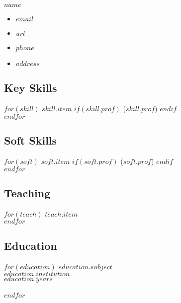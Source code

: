 \documentclass[$fontsize$, letter]{article}
\newcommand{\heading}[1]{
    \hrulefill \vspace{-0.5cm} \subsection*{{\color{gray} #1}}
}
\begin{document}
\begin{minipage}[t]{0.4\textwidth}
    {\Huge $name$}\\[.2cm]
\end{minipage}
\hfill
\begin{minipage}[b][2cm][b]{0.4\textwidth}
    \begin{itemize}[label={}, align=right]
        \item \hfill $email$
        \item \hfill \href{https://www.$url$}{$url$}
        \item \hfill $phone$
        \item \hfill $address$
    \end{itemize}
\end{minipage}


\begin{minipage}[t]{0.3\textwidth} %

\heading{Key Skills}
$for(skill)$
$skill.item$ $if(skill.prof)$ {\color{gray}($skill.prof$)} $endif$\\
$endfor$

\heading{Soft Skills}
$for(soft)$
$soft.item$ $if(soft.prof)$ {\color{gray}($soft.prof$)} $endif$\\
$endfor$

\heading{Teaching}
$for(teach)$
$teach.item$\\
$endfor$

\heading{Education}
$for(education)$
    $education.subject$\\
    {\small {\color{gray}
    $education.institution$\\
    $education.years$}}\\
    \\
$endfor$

\end{minipage}
\hfill
\end{document}
